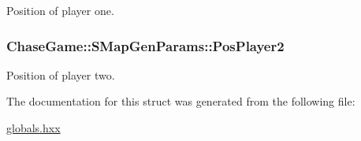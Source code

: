 Position of player one. 

\hypertarget{struct_chase_game_1_1_s_map_gen_params_afd0a0d4b22e228d547af88d38b6ae963}{
\subsubsection[{Pos\-Player2}]{ Chase\-Game\-::\-S\-Map\-Gen\-Params\-::\-Pos\-Player2}}\label{struct_chase_game_1_1_s_map_gen_params_afd0a0d4b22e228d547af88d38b6ae963}


Position of player two. 



The documentation for this struct was generated from the following file\-:\begin{DoxyCompactItemize}
\item 
\hyperlink{globals_8hxx}{globals.\-hxx}\end{DoxyCompactItemize}
